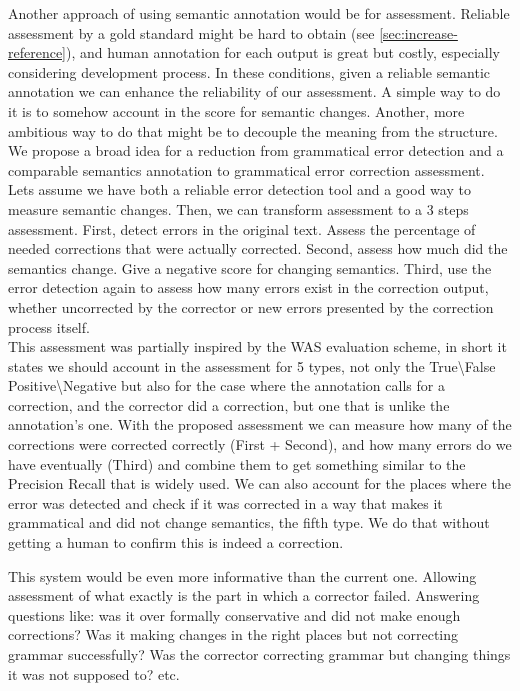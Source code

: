 \documentclass[english]{article}
\begin{document}
Another approach of using semantic annotation would be for assessment.
Reliable assessment by a gold standard might be hard to obtain (see
\ref{sec:increase-reference}), and human annotation for each output is great\cite{madnani2011they}
but costly, especially considering development process. In these conditions,
given a reliable semantic annotation we can enhance the reliability
of our assessment. A simple way to do it is to somehow account in the score for semantic changes. Another, more ambitious way to do that might be to decouple the meaning
from the structure. We propose a broad idea for a reduction from grammatical
error detection and a comparable semantics annotation to grammatical
error correction assessment. Lets assume we have both a reliable error
detection tool and a good way to measure semantic changes. Then, we
can transform assessment to a 3 steps assessment. First, detect errors
in the original text. Assess the percentage of needed corrections
that were actually corrected. Second, assess how much did the semantics change.
 Give a negative score for changing semantics. Third, use
the error detection again to assess how many errors exist in the correction
output, whether uncorrected by the corrector or new errors presented
by the correction process itself. \\

This assessment was partially inspired by the WAS evaluation scheme\cite{chodorow2012problems},
in short it states we should account in the assessment for 5 types,
not only the True\textbackslash{}False Positive\textbackslash{}Negative
but also for the case where the annotation calls for a correction,
and the corrector did a correction, but one that is unlike the annotation's
one. With the proposed assessment we can measure how many of the corrections
were corrected correctly (First + Second), and how many errors do
we have eventually (Third) and combine them to get something similar
to the Precision Recall that is widely used. We can also account for
the places where the error was detected and check if it was corrected
in a way that makes it grammatical and did not change semantics, the
fifth type. We do that without getting a human to confirm this is
indeed a correction.

This system would be even more informative than the current one. Allowing assessment of
what exactly is the part in which a corrector failed. Answering questions
like: was it over formally conservative and did not make enough corrections?
Was it making changes in the right places but not correcting grammar
successfully? Was the corrector correcting grammar but changing things
it was not supposed to? etc.
\end{document}
